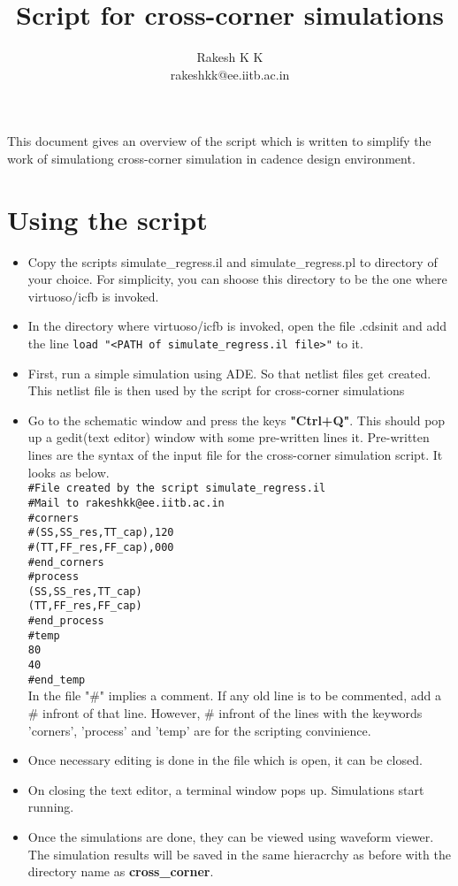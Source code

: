 \documentclass{article}
\begin{document}
\title{Script for cross-corner simulations}
\author{Rakesh K K\\rakeshkk@ee.iitb.ac.in}
\maketitle
This document gives an overview of the script which is written to simplify the work of simulationg cross-corner simulation in cadence design environment. 

\section{Using the script}
\begin{itemize}
\item Copy the scripts simulate\_regress.il and simulate\_regress.pl to directory of your choice. 
    	For simplicity, you can shoose this directory to be the one where virtuoso/icfb is invoked.
\item In the directory where virtuoso/icfb is invoked, open the file .cdsinit and add the line \texttt{load "<PATH of simulate\_regress.il file>"} to it.
\item First, run a simple simulation using ADE. So that netlist files get created. 
    	This netlist file is then used by the script for cross-corner simulations
\item Go to the schematic window and press the keys \textbf{"Ctrl+Q"}. This should pop up a gedit(text editor) window with some pre-written lines it. 
    	Pre-written lines are the syntax of the input file for the cross-corner simulation script. It looks as below.\\
	\texttt{\#File created by the script simulate\_regress.il\\
	\#Mail to rakeshkk@ee.iitb.ac.in\\
	\#corners\\
	\#(SS,SS\_res,TT\_cap),120\\
	\#(TT,FF\_res,FF\_cap),000\\
	\#end\_corners\\
	\#process\\
	(SS,SS\_res,TT\_cap)\\
	(TT,FF\_res,FF\_cap)\\
	\#end\_process\\
	\#temp\\
	80\\
	40\\
	\#end\_temp}\\
	In the file "\#" implies a comment. If any old line is to be commented, add a \# infront of that line. 
	However, \# infront of the lines with the keywords 'corners', 'process' and 'temp' are for the scripting convinience.
\item Once necessary editing is done in the file which is open, it can be closed. 
\item On closing the text editor, a terminal window pops up. Simulations start running.	
\item Once the simulations are done, they can be viewed using waveform viewer. 
    	The simulation results will be saved in the same hieracrchy as before with the directory name as \textbf{cross\_corner}.
\end{itemize}
\end{document}
